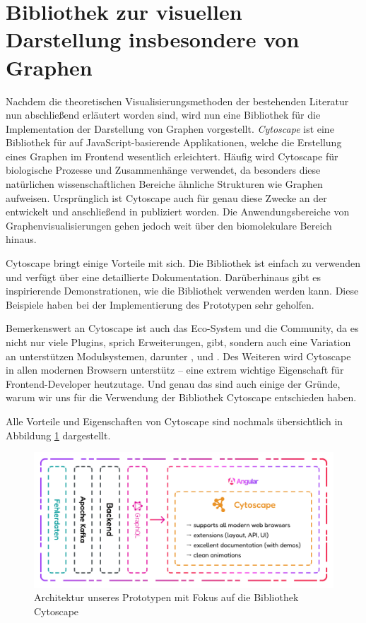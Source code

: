 \section{Bibliothek zur visuellen Darstellung insbesondere von Graphen}

Nachdem die theoretischen Visualisierungsmethoden der bestehenden Literatur nun abschließend erläutert worden sind, wird nun eine Bibliothek für die Implementation der Darstellung von Graphen vorgestellt. \emph{Cytoscape} ist eine Bibliothek für auf JavaScript-basierende Applikationen, welche die Erstellung eines Graphen im Frontend wesentlich erleichtert. Häufig wird Cytoscape für biologische Prozesse und Zusammenhänge verwendet, da besonders diese natürlichen wissenschaftlichen Bereiche ähnliche Strukturen wie Graphen aufweisen. Ursprünglich ist Cytoscape auch für genau diese Zwecke an der  entwickelt und anschließend in  publiziert worden. Die Anwendungsbereiche von Graphenvisualisierungen gehen jedoch weit über den biomolekulare Bereich hinaus. \cite{Cytoscape}

Cytoscape bringt einige Vorteile mit sich. Die Bibliothek ist einfach zu verwenden und verfügt über eine detaillierte Dokumentation. Darüberhinaus gibt es inspirierende Demonstrationen, wie die Bibliothek verwenden werden kann. Diese Beispiele haben bei der Implementierung des Prototypen sehr geholfen. \cite{Cytoscape}

Bemerkenswert an Cytoscape ist auch das Eco-System und die Community, da es nicht nur viele Plugins, sprich Erweiterungen, gibt, sondern auch eine Variation an unterstützen Modulsystemen, darunter ,  und . Des Weiteren wird Cytoscape in allen modernen Browsern unterstütz -- eine extrem wichtige Eigenschaft für Frontend-Developer heutzutage. Und genau das sind auch einige der Gründe, warum wir uns für die Verwendung der Bibliothek Cytoscape entschieden haben. \cite{Cytoscape}

Alle Vorteile und Eigenschaften von Cytoscape sind nochmals übersichtlich in Abbildung \ref{fig:CytoscapeArchitektur} dargestellt.

\begin{figure}
    \centering
    \includegraphics[width=1\textwidth]{content/img/Architecture/Architecture_Cytoscape.jpg}
    \caption{Architektur unseres Prototypen mit Fokus auf die Bibliothek Cytoscape}
    \label{fig:CytoscapeArchitektur}
\end{figure}
\FloatBarrier

